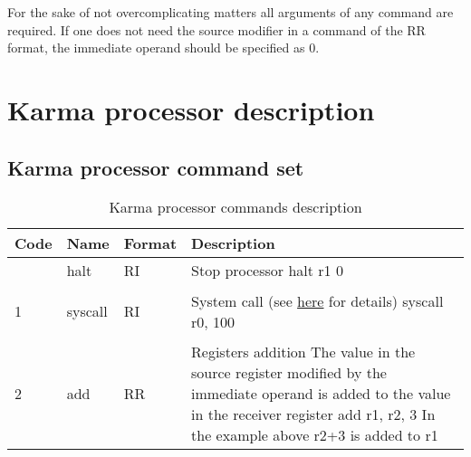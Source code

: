 \documentclass{article}
\newcommand{\St}[1]{{\fontfamily{qcr}\selectfont #1}}
\newcommand{\Ss}[1]{{\fontfamily{cmss}\selectfont #1}}
\begin{document}
For the sake of not overcomplicating matters all arguments of any command are required. If one does not need the source modifier in a command of the \Ss{RR} format, the immediate operand should be specified as 0.

\newpage

\section{\St{Karma} processor description}

\subsection{\St{Karma} processor command set}

{
\renewcommand{\arraystretch}{1.4}
\begin{table}[h!]
\centering
\caption{\St{Karma} processor commands description}
\vspace{2mm}
\centering
\begin{tabular}{| >{\centering\arraybackslash} m{1cm} | >{\centering\arraybackslash} m{1.4cm} | >{\centering\arraybackslash} m{1.2cm} | m{11.6cm} |} 
 \hline
 
 Code & Name & Format & Description\\
 
 \hline
 
 0 & \St{halt} & \Ss{RI} &
 
 Stop processor \newline
 \St{halt r1 0} \\
 
 \hline
 
 \hypertarget{syscall}{} 1 & \St{syscall} & \Ss{RI} &
 
 System call (see \hyperlink{syscall:details}{here} for details) \newline
 \St{syscall r0, 100} \\
 
 \hline
 
 2 & \St{add} & \Ss{RR} & 
 
 Registers addition \newline 
 The value in the source register modified by the immediate operand \newline
 is added to the value in the receiver register \newline
 \St{add r1, r2, 3} \newline
 In the example above \St{r2+3} is added to \St{r1} \\
 

\end{tabular}
\end{table}}
\end{document}
